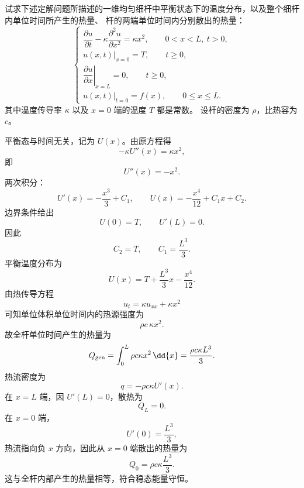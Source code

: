 \begin{question}
试求下述定解问题所描述的一维均匀细杆中平衡状态下的温度分布，以及整个细杆内单位时间所产生的热量、
杆的两端单位时间内分别散出的热量：
\[
\begin{cases}
\dfrac{\partial u}{\partial t}-\kappa\dfrac{\partial^2u}{\partial x^2}
=\kappa x^2,\qquad 0<x<L,\ t>0,\\
u(x,t)|_{x=0}=T,\qquad t\ge0,\\
\left.\dfrac{\partial u}{\partial x}\right|_{x=L}=0,\qquad t\ge0,\\
u(x,t)|_{t=0}=f(x),\qquad 0\le x\le L.
\end{cases}
\]
其中温度传导率 \(\kappa\) 以及 \(x=0\) 端的温度 \(T\) 都是常数。
设杆的密度为 \(\rho\)，比热容为 \(c\)。
\begin{solution}
平衡态与时间无关，记为 \(U(x)\)。由原方程得
\[
-\kappa U''(x)=\kappa x^2,
\]
即
\[
U''(x)=-x^2.
\]
两次积分：
\[
U'(x)=-\frac{x^3}{3}+C_1,\qquad
U(x)=-\frac{x^4}{12}+C_1x+C_2.
\]
边界条件给出
\[
U(0)=T,\qquad U'(L)=0.
\]
因此
\[
C_2=T,\qquad C_1=\frac{L^3}{3}.
\]
平衡温度分布为
\[
U(x)=T+\frac{L^3}{3}x-\frac{x^4}{12}.
\]
由热传导方程
\[
u_t=\kappa u_{xx}+\kappa x^2
\]
可知单位体积单位时间内的热源强度为
\[
\rho c\,\kappa x^2.
\]
故全杆单位时间产生的热量为
\[
Q_{\rm gen}=\int_0^L \rho c\kappa x^2\,\dd{x}
=\frac{\rho c\kappa L^3}{3}.
\]
热流密度为
\[
q=-\rho c\kappa U'(x).
\]
在 \(x=L\) 端，因 \(U'(L)=0\)，散热为
\[
Q_L=0.
\]
在 \(x=0\) 端，
\[
U'(0)=\frac{L^3}{3},
\]
热流指向负 \(x\) 方向，因此从 \(x=0\) 端散出的热量为
\[
Q_0=\rho c\kappa\frac{L^3}{3}.
\]
这与全杆内部产生的热量相等，符合稳态能量守恒。
\end{solution}
\end{question}

